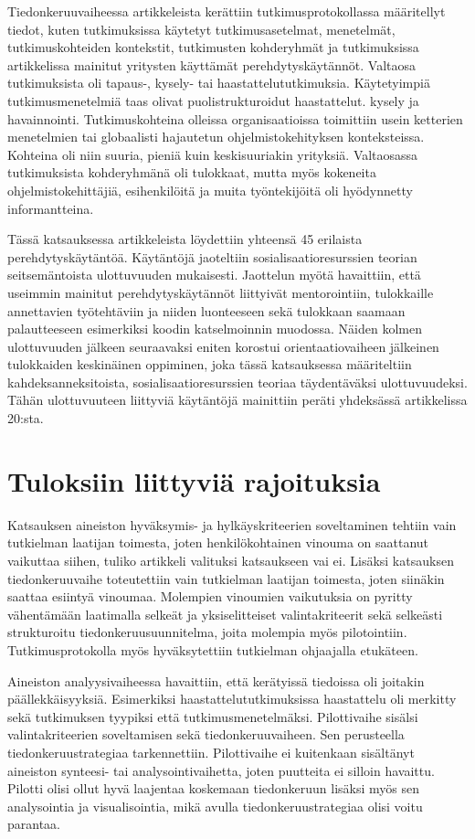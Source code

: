 \documentclass[utf8]{gradu3}
\begin{document}
Tiedonkeruuvaiheessa artikkeleista kerättiin tutkimusprotokollassa määritellyt tiedot, kuten tutkimuksissa käytetyt tutkimusasetelmat, menetelmät, tutkimuskohteiden kontekstit, tutkimusten kohderyhmät ja tutkimuksissa artikkelissa mainitut yritysten käyttämät perehdytyskäytännöt. Valtaosa tutkimuksista oli tapaus-, kysely- tai haastattelututkimuksia. Käytetyimpiä tutkimusmenetelmiä taas olivat puolistrukturoidut haastattelut. kysely ja havainnointi. Tutkimuskohteina olleissa organisaatioissa toimittiin usein ketterien menetelmien tai globaalisti hajautetun ohjelmistokehityksen  konteksteissa. Kohteina oli niin suuria, pieniä kuin keskisuuriakin yrityksiä. Valtaosassa tutkimuksista kohderyhmänä oli tulokkaat, mutta myös kokeneita ohjelmistokehittäjiä, esihenkilöitä ja muita työntekijöitä oli hyödynnetty informantteina. 

Tässä katsauksessa artikkeleista löydettiin yhteensä 45 erilaista perehdytyskäytäntöä. Käytäntöjä jaoteltiin sosialisaatioresurssien teorian seitsemäntoista ulottuvuuden mukaisesti. Jaottelun myötä havaittiin, että useimmin mainitut perehdytyskäytännöt liittyivät mentorointiin, tulokkaille annettavien työtehtäviin ja niiden luonteeseen sekä tulokkaan saamaan palautteeseen esimerkiksi koodin katselmoinnin muodossa. Näiden kolmen ulottuvuuden jälkeen seuraavaksi eniten korostui orientaatiovaiheen jälkeinen tulokkaiden keskinäinen oppiminen, joka tässä katsauksessa määriteltiin kahdeksanneksitoista, sosialisaatioresurssien teoriaa täydentäväksi ulottuvuudeksi. Tähän ulottuvuuteen liittyviä käytäntöjä mainittiin peräti yhdeksässä artikkelissa 20:sta.


\section{Tuloksiin liittyviä rajoituksia}
\label{luku-rajoitteet}

Katsauksen aineiston hyväksymis- ja hylkäyskriteerien soveltaminen tehtiin vain tutkielman laatijan toimesta, joten henkilökohtainen vinouma on saattanut vaikuttaa siihen, tuliko artikkeli valituksi katsaukseen vai ei. Lisäksi katsauksen tiedonkeruuvaihe toteutettiin vain tutkielman laatijan toimesta, joten siinäkin saattaa esiintyä vinoumaa. Molempien vinoumien vaikutuksia on pyritty vähentämään laatimalla selkeät ja yksiselitteiset valintakriteerit sekä selkeästi strukturoitu tiedonkeruusuunnitelma, joita molempia myös pilotointiin. Tutkimusprotokolla myös hyväksytettiin tutkielman ohjaajalla etukäteen. 

Aineiston analyysivaiheessa havaittiin, että kerätyissä tiedoissa oli joitakin päällekkäisyyksiä. Esimerkiksi haastattelututkimuksissa haastattelu oli merkitty sekä tutkimuksen tyypiksi että tutkimusmenetelmäksi. Pilottivaihe sisälsi valintakriteerien soveltamisen sekä tiedonkeruuvaiheen. Sen perusteella tiedonkeruustrategiaa tarkennettiin. Pilottivaihe ei kuitenkaan sisältänyt aineiston synteesi- tai analysointivaihetta, joten puutteita ei silloin havaittu. Pilotti olisi ollut hyvä laajentaa koskemaan tiedonkeruun lisäksi myös sen analysointia ja visualisointia, mikä avulla tiedonkeruustrategiaa olisi voitu parantaa.
\end{document}

